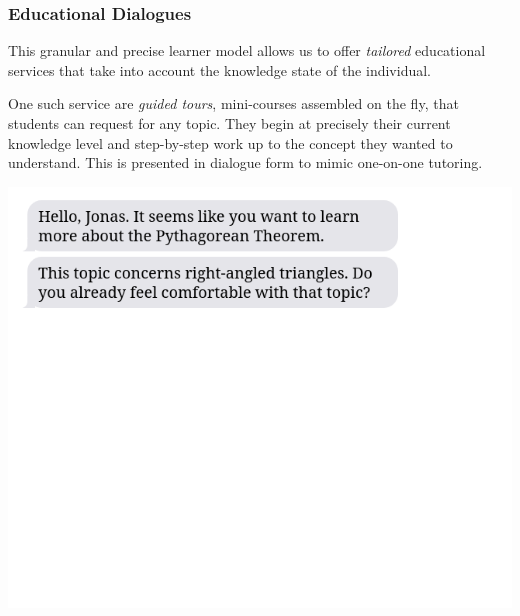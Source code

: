\documentclass[aspectratio=169, usenames, dvipsnames]{beamer}
\begin{document}
\begin{frame}
\frametitle{Educational Dialogues}
\begin{minipage}{0.45\textwidth}
This granular and precise learner model allows us to offer \emph{tailored}
educational services that take into account the knowledge state of the individual.
\bigskip

One such service are \emph{guided tours}, mini-courses assembled on the fly, that students can request for any topic. They begin at precisely their current knowledge level and step-by-step work up to the concept they wanted to understand. This is presented in dialogue form to mimic one-on-one tutoring.
\end{minipage}%
\hfill
\begin{minipage}{0.5\textwidth}
\pause
\includegraphics[height=0.75\textheight,keepaspectratio]{images/bubbles_example_step1} 
\end{minipage}%
\end{frame}
\end{document}
